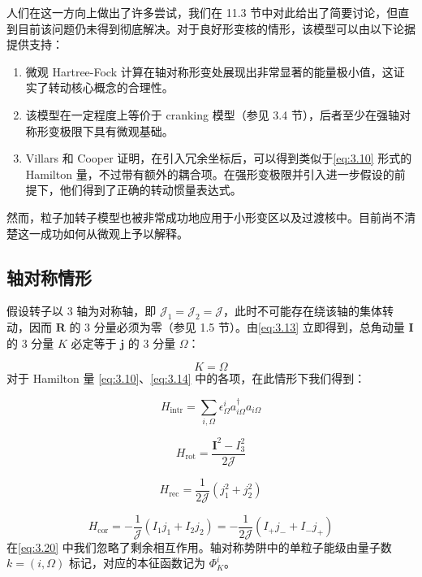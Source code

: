 人们在这一方向上做出了许多尝试，我们在 11.3 节中对此给出了简要讨论，但直到目前该问题仍未得到彻底解决。对于良好形变核的情形，该模型可以由以下论据提供支持：
\begin{enumerate}
\item[(i)] 微观 Hartree-Fock 计算在轴对称形变处展现出非常显著的能量极小值，这证实了转动核心概念的合理性。
\item[(ii)] 该模型在一定程度上等价于 cranking 模型（参见 3.4 节），后者至少在强轴对称形变极限下具有微观基础。
\item[(iii)] Villars 和 Cooper \cite{VC70} 证明，在引入冗余坐标后，可以得到类似于\ref{eq:3.10} 形式的
Hamilton 量，不过带有额外的耦合项。在强形变极限并引入进一步假设的前提下，他们得到了正确的转动惯量表达式。
\end{enumerate}
然而，粒子加转子模型也被非常成功地应用于小形变区以及过渡核中。目前尚不清楚这一成功如何从微观上予以解释。

\subsection{轴对称情形}

假设转子以 3 轴为对称轴，即 $\mathcal{J}_{1}=\mathcal{J}_{2}=\mathcal{J}$，此时不可能存在绕该轴的集体转动，因而
$\boldsymbol{R}$ 的 3 分量必须为零（参见 1.5 节）。由\ref{eq:3.13} 立即得到，总角动量 $\boldsymbol{I}$
的 3 分量 $K$ 必定等于 $\boldsymbol{j}$ 的 3 分量 $\Omega$：

\begin{equation}
K=\Omega\label{eq:3.19}
\end{equation}
对于 Hamilton 量 \ref{eq:3.10}、\ref{eq:3.14} 中的各项，在此情形下我们得到：

\begin{equation}
H_{\text{intr}}=\sum_{i,\Omega}\epsilon^{i}_{\Omega}a^{\dagger}_{i\Omega}a_{i\Omega}\label{eq:3.20}
\end{equation}

\begin{equation}
H_{\text{rot}}=\frac{\boldsymbol{I}^{2}-I^{2}_{3}}{2\mathcal{J}}\label{eq:3.21}
\end{equation}

\begin{equation}
H_{\text{rec}}=\frac{1}{2\mathcal{J}}\left(j^{2}_{1}+j^{2}_{2}\right)\label{eq:3.22}
\end{equation}

\begin{equation}
H_{\text{cor}}=-\frac{1}{\mathcal{J}}\left(I_{1}j_{1}+I_{2}j_{2}\right)=-\frac{1}{2\mathcal{J}}\left(I_{+}j_{-}+I_{-}j_{+}\right)\label{eq:3.23}
\end{equation}
在\ref{eq:3.20} 中我们忽略了剩余相互作用。轴对称势阱中的单粒子能级由量子数 $k=(i,\Omega)$ 标记，对应的本征函数记为
$\Phi^{i}_{K}$。

